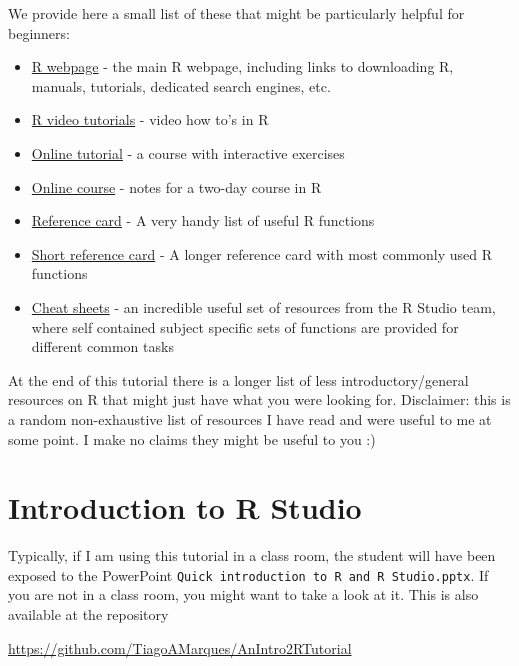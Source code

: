 \documentclass[
]{article}
\begin{document}
We provide here a small list of these that might be particularly helpful
for beginners:

\begin{itemize}
\item
  \href{http://r-project.org}{R webpage} - the main R webpage, including
  links to downloading R, manuals, tutorials, dedicated search engines,
  etc.
\item
  \href{http://blog.revolutionanalytics.com/2013/08/google-video-r-tutorials.html}{R
  video tutorials} - video how to's in R
\item
  \href{http://www.datamind.org/}{Online tutorial} - a course with
  interactive exercises
\item
  \href{http://faculty.washington.edu/tlumley/Rcourse/}{Online course} -
  notes for a two-day course in R
\item
  \href{http://cran.r-project.org/doc/contrib/refcard.pdf}{Reference
  card} - A very handy list of useful R functions
\item
  \href{http://cran.r-project.org/doc/contrib/Short-refcard.pdf}{Short
  reference card} - A longer reference card with most commonly used R
  functions
\item
  \href{https://www.rstudio.com/resources/cheatsheets/}{Cheat sheets} -
  an incredible useful set of resources from the R Studio team, where
  self contained subject specific sets of functions are provided for
  different common tasks
\end{itemize}

At the end of this tutorial there is a longer list of less
introductory/general resources on R that might just have what you were
looking for. Disclaimer: this is a random non-exhaustive list of
resources I have read and were useful to me at some point. I make no
claims they might be useful to you :)

\hypertarget{introduction-to-r-studio}{%
\section{Introduction to R Studio}\label{introduction-to-r-studio}}

Typically, if I am using this tutorial in a class room, the student will
have been exposed to the PowerPoint
\texttt{Quick\ introduction\ to\ R\ and\ R\ Studio.pptx}. If you are not
in a class room, you might want to take a look at it. This is also
available at the repository

\url{https://github.com/TiagoAMarques/AnIntro2RTutorial}
\end{document}
